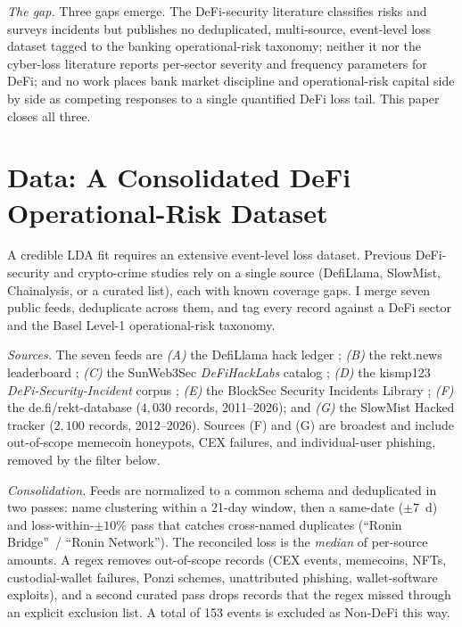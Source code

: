 \documentclass[runningheads]{llncs}
\begin{document}
\emph{The gap.} Three gaps emerge. The DeFi-security literature
classifies risks and surveys incidents but publishes no deduplicated,
multi-source, event-level loss dataset tagged to the banking
operational-risk taxonomy; neither it nor the cyber-loss literature
reports per-sector severity and frequency parameters for DeFi; and no
work places bank market discipline and operational-risk capital side by
side as competing responses to a single quantified DeFi loss tail. This
paper closes all three.


\section{Data: A Consolidated DeFi Operational-Risk Dataset}\label{sec:data}

A credible LDA fit requires an extensive event-level loss dataset.
Previous DeFi-security and crypto-crime studies rely on a single
source (DefiLlama, SlowMist, Chainalysis, or a curated list), each
with known coverage gaps. I merge seven public feeds,
deduplicate across them, and tag every record against a DeFi sector
and the Basel Level-1 operational-risk taxonomy.

\emph{Sources.} The seven feeds are
\emph{(A)} the DefiLlama hack ledger \citep{Defillama};
\emph{(B)} the rekt.news leaderboard \citep{Rekt2026};
\emph{(C)} the SunWeb3Sec \emph{DeFiHackLabs} catalog
\citep{DeFiHackLabs2026};
\emph{(D)} the kismp123 \emph{DeFi-Security-Incident} corpus
\citep{Kismp2026};
\emph{(E)} the BlockSec Security Incidents Library \citep{BlockSec2026};
\emph{(F)} the de.fi/rekt-database \citep{DeFiRektDb2026}
($4{,}030$ records, 2011--2026); and \emph{(G)} the SlowMist Hacked
tracker \citep{SlowMistHacked2026} ($2{,}100$ records, 2012--2026).
Sources (F) and (G) are broadest and include out-of-scope memecoin
honeypots, CEX failures, and individual-user phishing, removed by the
filter below.

\emph{Consolidation.} Feeds are normalized to a common schema and
deduplicated in two passes: name clustering within a 21-day window,
then a same-date ($\pm 7$~d) and loss-within-$\pm 10\%$ pass that
catches cross-named duplicates (``Ronin Bridge''~/ ``Ronin Network'').
The reconciled loss is the \emph{median} of per-source amounts. A regex
removes out-of-scope records (CEX events, memecoins, NFTs, custodial-wallet failures,
Ponzi schemes, unattributed phishing, wallet-software exploits), and a second curated pass drops records that the regex missed through an explicit exclusion list. A total of 153 events is excluded as Non-DeFi this way.
\end{document}
